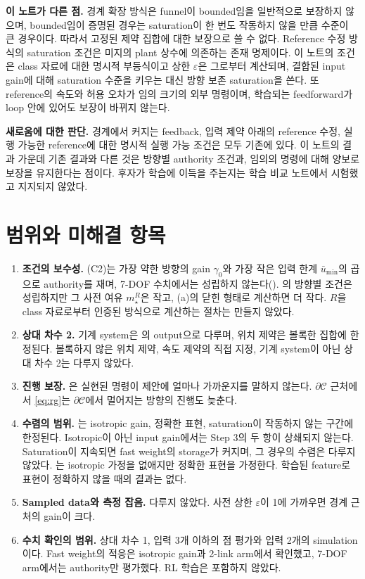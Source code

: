 \documentclass[11pt]{article}\usepackage[margin=1in]{geometry}\usepackage{amsmath,amssymb,amsthm,mathtools}\usepackage{graphicx}\graphicspath{{figures/}{../figures/}{figs/}{./}}\usepackage{enumitem}\usepackage{hyperref}\usepackage{cleveref}\usepackage{tikz}\usetikzlibrary{arrows.meta,positioning,calc,shapes.geometric}\usepackage{float}\usepackage[most]{tcolorbox}\usepackage{kotex}\usepackage{booktabs}\emergencystretch=1.6em\tolerance=2000 \crefname{assumption}{Assumption}{Assumptions}\Crefname{assumption}{Assumption}{Assumptions}\crefname{definition}{Definition}{Definitions}\Crefname{definition}{Definition}{Definitions}\crefname{proposition}{Proposition}{Propositions}\Crefname{proposition}{Proposition}{Propositions}\crefname{fact}{Fact}{Facts}\Crefname{fact}{Fact}{Facts} \newtheorem{assumption}{Assumption}\newtheorem{definition}{Definition}\newtheorem{lemma}{Lemma}\newtheorem{proposition}{Proposition}\newtheorem{theorem}{Theorem}\newtheorem{corollary}{Corollary}\newtheorem{fact}{Fact}\theoremstyle{remark}\newtheorem{remark}{Remark} \newcommand{\R}{\mathbb{R}}\newcommand{\U}{\mathcal U}
\newcommand{\Cset}{\mathcal C}\newcommand{\Pcl}{\mathcal P}\newcommand{\Zset}{\mathcal Z_0}\newcommand{\Xset}{\mathcal X_0}
\begin{document}
\textbf{이 노트가 다른 점.} 경계 확장 방식은 funnel이 bounded임을 일반적으로 보장하지 않으며, bounded임이 증명된 경우는 saturation이 한 번도 작동하지 않을 만큼 수준이 큰 경우이다. 따라서 고정된 제약 집합에 대한 보장으로 쓸 수 없다. Reference 수정 방식의 saturation 조건은 미지의 plant 상수에 의존하는 존재 명제이다. 이 노트의 조건은 class 자료에 대한 명시적 부등식이고 상한 $\varepsilon$은 그로부터 계산되며, 결합된 input gain에 대해 saturation 수준을 키우는 대신 방향 보존 saturation을 쓴다. 또 reference의 속도와 허용 오차가 임의 크기의 외부 명령이며, 학습되는 feedforward가 loop 안에 있어도 보장이 바뀌지 않는다.

\textbf{새로움에 대한 판단.} 경계에서 커지는 feedback, 입력 제약 아래의 reference 수정, 실행 가능한 reference에 대한 명시적 실행 가능 조건은 모두 기존에 있다. 이 노트의 결과 가운데 기존 결과와 다른 것은 방향별 authority 조건과, 임의의 명령에 대해 양보로 보장을 유지한다는 점이다. 후자가 학습에 이득을 주는지는 학습 비교 노트에서 시험했고 지지되지 않았다.

\section{범위와 미해결 항목}
\label{sec:open}

\begin{enumerate}
\item \textbf{조건의 보수성.} (C2)는 가장 약한 방향의 gain $\gamma_0$와 가장 작은 입력 한계 $\bar u_{\min}$의 곱으로 authority를 재며, 7-DOF 수치에서는 성립하지 않는다(). 의 방향별 조건은 성립하지만 그 사전 여유 $m_\star^R$은 작고, (a)의 닫힌 형태로 계산하면 더 작다. $R$을 class 자료로부터 인증된 방식으로 계산하는 절차는 만들지 않았다.
\item \textbf{상대 차수 2.} 기계 system은 의 output으로 다루며, 위치 제약은 볼록한 집합에 한정된다. 볼록하지 않은 위치 제약, 속도 제약의 직접 지정, 기계 system이 아닌 상대 차수 2는 다루지 않았다.
\item \textbf{진행 보장.} 은 실현된 명령이 제안에 얼마나 가까운지를 말하지 않는다. $\partial\Cset$ 근처에서 \eqref{eq:rg}는 $\partial\Cset$에서 멀어지는 방향의 진행도 늦춘다.
\item \textbf{수렴의 범위.} 는 isotropic gain, 정확한 표현, saturation이 작동하지 않는 구간에 한정된다. Isotropic이 아닌 input gain에서는 Step 3의 두 항이 상쇄되지 않는다. Saturation이 지속되면 fast weight의 storage가 커지며, 그 경우의 수렴은 다루지 않았다. 는 isotropic 가정을 없애지만 정확한 표현을 가정한다. 학습된 feature로 표현이 정확하지 않을 때의 결과는 없다.
\item \textbf{Sampled data와 측정 잡음.} 다루지 않았다. 사전 상한 $\varepsilon$이 1에 가까우면 경계 근처의 gain이 크다.
\item \textbf{수치 확인의 범위.} 상대 차수 1, 입력 3개 이하의 점 평가와 입력 2개의 simulation이다. Fast weight의 적응은 isotropic gain과 2-link arm에서 확인했고, 7-DOF arm에서는 authority만 평가했다. RL 학습은 포함하지 않았다.
\end{enumerate}
\end{document}
